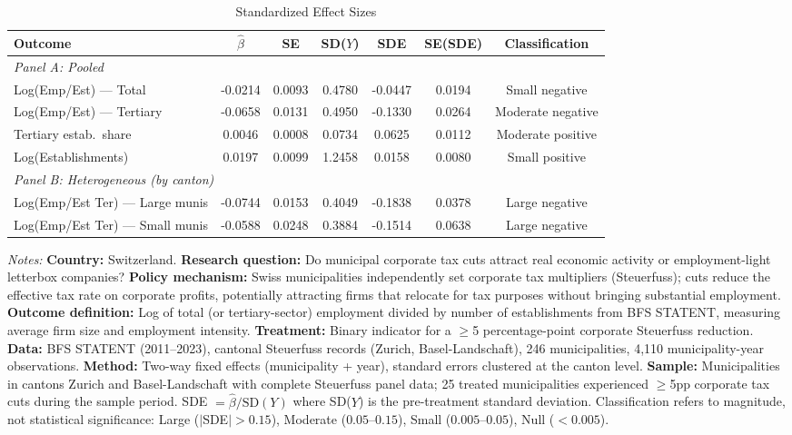 \begin{table}[htbp]
\centering
\caption{Standardized Effect Sizes}
\label{tab:sde}
\begin{adjustbox}{max width=\textwidth}
\begin{tabular}{lcccccc}
\toprule
Outcome & $\hat{\beta}$ & SE & SD($Y$) & SDE & SE(SDE) & Classification \\
\midrule
\multicolumn{7}{l}{\textit{Panel A: Pooled}} \\
Log(Emp/Est) --- Total & -0.0214 & 0.0093 & 0.4780 & -0.0447 & 0.0194 & Small negative \\
Log(Emp/Est) --- Tertiary & -0.0658 & 0.0131 & 0.4950 & -0.1330 & 0.0264 & Moderate negative \\
Tertiary estab.\ share & 0.0046 & 0.0008 & 0.0734 & 0.0625 & 0.0112 & Moderate positive \\
Log(Establishments) & 0.0197 & 0.0099 & 1.2458 & 0.0158 & 0.0080 & Small positive \\
\midrule
\multicolumn{7}{l}{\textit{Panel B: Heterogeneous (by canton)}} \\
Log(Emp/Est Ter) --- Large munis & -0.0744 & 0.0153 & 0.4049 & -0.1838 & 0.0378 & Large negative \\
Log(Emp/Est Ter) --- Small munis & -0.0588 & 0.0248 & 0.3884 & -0.1514 & 0.0638 & Large negative \\
\bottomrule
\end{tabular}
\end{adjustbox}
\begin{tablenotes}[flushleft]
\scriptsize
\item \textit{Notes:} \textbf{Country:} Switzerland. \textbf{Research question:} Do municipal corporate tax cuts attract real economic activity or employment-light letterbox companies? \textbf{Policy mechanism:} Swiss municipalities independently set corporate tax multipliers (Steuerfuss); cuts reduce the effective tax rate on corporate profits, potentially attracting firms that relocate for tax purposes without bringing substantial employment. \textbf{Outcome definition:} Log of total (or tertiary-sector) employment divided by number of establishments from BFS STATENT, measuring average firm size and employment intensity. \textbf{Treatment:} Binary indicator for a $\geq$5 percentage-point corporate Steuerfuss reduction. \textbf{Data:} BFS STATENT (2011--2023), cantonal Steuerfuss records (Zurich, Basel-Landschaft), 246 municipalities, 4,110 municipality-year observations. \textbf{Method:} Two-way fixed effects (municipality + year), standard errors clustered at the canton level. \textbf{Sample:} Municipalities in cantons Zurich and Basel-Landschaft with complete Steuerfuss panel data; 25 treated municipalities experienced $\geq$5pp corporate tax cuts during the sample period. SDE $= \hat{\beta} / \text{SD}(Y)$ where SD($Y$) is the pre-treatment standard deviation. Classification refers to magnitude, not statistical significance: Large ($|$SDE$| > 0.15$), Moderate ($0.05$--$0.15$), Small ($0.005$--$0.05$), Null ($< 0.005$).
\end{tablenotes}
\end{table}
